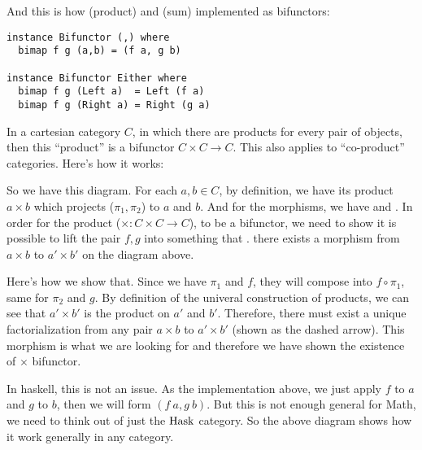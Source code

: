 And this is how \code{(,)} (product) and  (sum) implemented as
bifunctors:

\begin{lstlisting}
instance Bifunctor (,) where
  bimap f g (a,b) = (f a, g b)

instance Bifunctor Either where
  bimap f g (Left a)  = Left (f a)
  bimap f g (Right a) = Right (g a)
\end{lstlisting}

In a cartesian category $C$, in which there are products for every pair of
objects, then this ``product'' is a bifunctor $C\times C \to C$. This also
applies to ``co-product'' categories. Here's how it works:

\begin{center}
\end{center}

So we have this diagram. For each $a, b \in C$, by definition, we have its
product $a\times b$ which projects ($\pi_1, \pi_2$) to $a$ and $b$. And for the
morphisms, we have  and . In order for
the product ($\times : C\times C \to C$), to be a bifunctor, we need to show it
is possible to lift the pair $f, g$ into something that . \ie there exists a morphism from $a\times b$
to $a'\times b'$ on the diagram above.

\begin{center}
\end{center}

Here's how we show that. Since we have $\pi_1$ and $f$, they will compose into
$f \circ \pi_1$, same for $\pi_2$ and $g$. By definition of the univeral
construction of products, we can see that $a'\times b'$ is the product on $a'$
and $b'$. Therefore, there must exist a unique factorialization from any pair
$a\times b$ to $a'\times b'$ (shown as the dashed arrow). This morphism is what
we are looking for and therefore we have shown the existence of $\times$
bifunctor.

In haskell, this is not an issue. As the implementation above, we just apply $f$
to $a$ and $g$ to $b$, then we will form $(f~a, g~b)$. But this is not enough
general for Math, we need to think out of just the $\mathrm{Hask}$ category. So the
above diagram shows how it work generally in any category.
